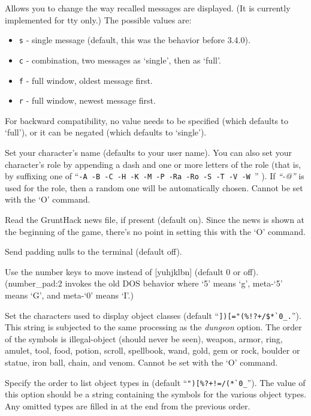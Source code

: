Allows you to change the way recalled messages are displayed.
(It is currently implemented for tty only.)
The possible values are:
\begin{itemize}
\item {\tt s} - single message (default, this was the behavior before 3.4.0).
\item {\tt c} - combination, two messages as `single', then as `full'.
\item {\tt f} - full window, oldest message first.
\item {\tt r} - full window, newest message first.
\end{itemize}
For backward compatibility, no value needs to be specified (which
defaults to `full'), or it can be negated (which defaults to `single').
\item[\tb{``name    ''}]
Set your character's name (defaults to your user name).  You can also
set your character's role by appending a dash and one or more letters of
the role (that is, by suffixing one of
``{\tt -A -B -C -H -K -M -P -Ra -Ro -S -T -V -W }'' ).
If
{\it ``-@'' }
is used for the role, then a random one will be automatically chosen.
Cannot be set with the `O' command.
\item[\tb{``news    ''}]
Read the GruntHack news file, if present (default on).
Since the news is shown at the beginning of the game, there's no point
in setting this with the `O' command.
\item[\tb{``null    ''}]
Send padding nulls to the terminal (default off).
\item[\tb{number\_pad}]
Use the number keys to move instead of [yuhjklbn] (default 0 or off).
(number\_pad:2 invokes the old DOS behavior where `5' means `g', meta-`5'
means `G',  and meta-`0' means `I'.)
\item[\tb{objects}]
Set the characters used to display object classes
 (default
``\verb&])[="(%!?+/$*`0_.&'').
This string is subjected to the same processing as the
{\it dungeon }
option.
The order of the symbols is
illegal-object (should never be seen), weapon, armor, ring, amulet, tool,
food, potion, scroll, spellbook, wand, gold, gem or rock, boulder or statue,
iron ball, chain, and venom.
Cannot be set with the `O' command.
\item[\tb{packorder}]
Specify the order to list object types in (default
``\verb&")[%?+!=/(*`0_&''). The value of this option should be a string
containing the symbols for the various object types.  Any omitted types
are filled in at the end from the previous order.
\item[\ib{paranoid\_hit}]
